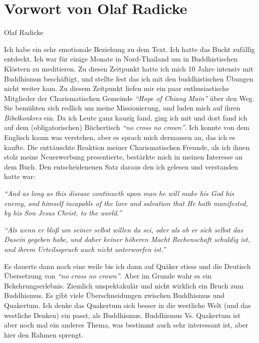 \part{Vorwort von Olaf Radicke}



\begin{flushright}
\begin{footnotesize}
Olaf Radicke
\end{footnotesize}
\end{flushright}
\smallskip

Ich habe ein sehr emotionale Beziehung zu dem Text. Ich hatte das Bucht zufällig
entdeckt. Ich war für einige Monate in Nord-Thailand um in Buddhistischen
Klöstern zu meditieren. Zu diesen Zeitpunkt hatte ich mich 10 Jahre intensiv mit
Buddhismus beschäftigt, und stellte fest das ich mit den buddhistischen Übungen
nicht weiter kam. Zu diesem Zeitpunkt liefen mir ein paar enthusiastische
Mitglieder der Charismatischen Gemeinde \textit{"`Hope of Chiang Main"'} über
den Weg. Sie bemühten sich redlich um meine Missionierung, und luden mich auf
ihren \textit{Bibelkonkres} ein. Da ich Leute ganz kauzig fand, ging ich mit und
dort fand ich auf dem (obligatorischen) Büchertisch \textit{"`no cross no crown"'}.
Ich konnte von dem Englisch kaum was verstehen, aber es sprach mich dermassen
an, das ich es kaufte. Die enttäuschte Reaktion meiner Charismatischen Freunde,
als ich ihnen stolz meine Neuerwerbung presentierte, bestärkte mich in meinen Interesse an dem Buch. Den entscheidenenen Satz daraus den ich gelesen und verstanden hatte war:

\begin{center}
\parbox{7,5cm}{
\textit{"`And as long as this disease continueth upon man he will make his God his enemy, and himself incapable of the love and salvation that He hath manifested, by his Son Jesus Christ, to the world."'}

\medskip

\textit{"`Als wenn er bloß um seiner selbst willen da sei, oder als ob er
sich selbst das Dasein gegeben habe, und daher keiner höheren Macht Rechenschaft
schuldig ist, und ihrem Urteilsspruch auch nicht unterworfen ist."'}
}
\end{center}

\medskip

Es dauerte dann noch eine weile bis ich dann auf Quäker stiess und die Deutisch
Übersetzung von \textit{"`no cross no crown"'}. Aber im Grunde wahr es ein
Bekehrungserlebnis. Ziemlich unspektakulär und nicht wirklich ein Bruch zum
Buddhismus. Es gibt viele Überschneidungen zwischen Buddhismus und Quakertum.
Ich denke das Quakertum sich besser in die westliche Welt (und das westliche
Denken) ein passt, als Buddhismus. Buddhismus Vs. Quakertum ist aber noch mal
ein anderes Thema, was bestimmt auch sehr interessant ist, aber hier den Rahmen
sprengt.

